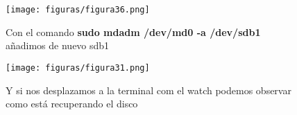 \begin{figure}[H] %
	\centering
	\texttt{[image: figuras/figura36.png]}  %
	\label{figura36}
	
	\caption{Con el comando \textbf{sudo mdadm /dev/md0 -a /dev/sdb1} añadimos de nuevo sdb1} 
\end{figure}

\begin{figure}[H] %
	\centering
	\texttt{[image: figuras/figura31.png]}  %
	\label{figura31}
	
	\caption{Y si nos desplazamos a la terminal com el watch podemos observar como está recuperando el disco} 
\end{figure}

\newpage
